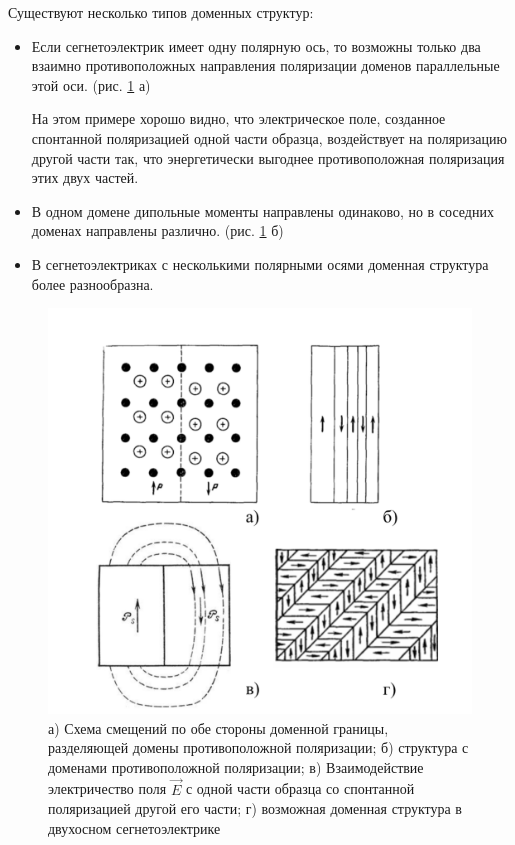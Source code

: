 \documentclass[a4paper]{article}
\begin{document}
Существуют несколько типов доменных структур:

\begin{itemize}

\item

Если сегнетоэлектрик имеет одну полярную ось, то возможны только два взаимно противоположных направления поляризации доменов параллельные этой оси. (рис. \ref{p4} а)

На этом примере хорошо видно, что электрическое поле, созданное спонтанной поляризацией одной части образца, воздействует на поляризацию другой части так, что энергетически выгоднее противоположная поляризация этих двух частей. 

\item

В одном домене дипольные моменты направлены одинаково, но в соседних доменах направлены различно. (рис. \ref{p4} б)

\item

В сегнетоэлектриках с несколькими полярными осями доменная структура более разнообразна. 

\end{itemize}


\begin{figure}[H]
\begin{center}
\includegraphics[scale = 0.35]{p4.png}

\caption{а) Схема смещений по обе стороны доменной границы, разделяющей домены противоположной поляризации; б) структура с доменами противоположной поляризации; в) Взаимодействие электричество поля $\vec{E}$ с одной части образца со спонтанной поляризацией другой его части; г) возможная доменная структура в двухосном сегнетоэлектрике}
\label{p4}
\end{center}
\end{figure}
\end{document}
